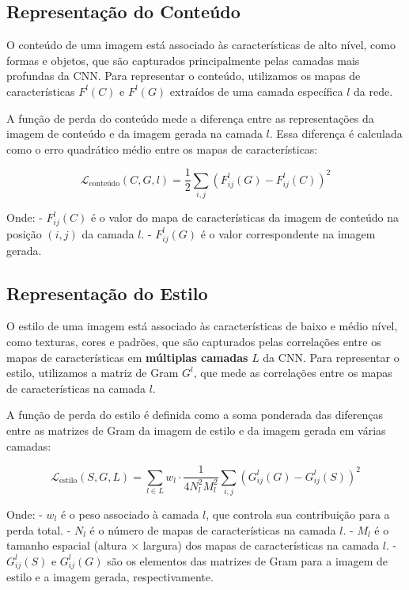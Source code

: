 \documentclass[a4paper]{tufte-handout}
\begin{document}
\subsection{Representação do Conteúdo}

O conteúdo de uma imagem está associado às características de alto nível, como formas e objetos, que são capturados principalmente pelas camadas mais profundas da CNN. Para representar o conteúdo, utilizamos os mapas de características $F^l(C)$ e $F^l(G)$ extraídos de uma camada específica $l$ da rede.

A função de perda do conteúdo mede a diferença entre as representações da imagem de conteúdo e da imagem gerada na camada $l$. Essa diferença é calculada como o erro quadrático médio entre os mapas de características:

\begin{equation*}
    \mathcal{L}_{\text{conteúdo}} (C, G, l) = \frac{1}{2} \sum_{i,j} \left(F_{ij}^l(G) - F_{ij}^l(C)\right)^2
\end{equation*}

Onde:
- $F_{ij}^l(C)$ é o valor do mapa de características da imagem de conteúdo na posição $(i,j)$ da camada $l$.
- $F_{ij}^l(G)$ é o valor correspondente na imagem gerada.

\subsection{Representação do Estilo}

O estilo de uma imagem está associado às características de baixo e médio nível, como texturas, cores e padrões, que são capturados pelas correlações entre os mapas de características em \textbf{múltiplas camadas} $L$ da CNN. Para representar o estilo, utilizamos a matriz de Gram $G^l$, que mede as correlações entre os mapas de características na camada $l$.

A função de perda do estilo é definida como a soma ponderada das diferenças entre as matrizes de Gram da imagem de estilo e da imagem gerada em várias camadas:

\begin{equation*}
    \mathcal{L}_{\text{estilo}} (S, G, L) = \sum_{l \in L} w_l \cdot \frac{1}{4N_l^2 M_l^2} \sum_{i,j} \left(G^l_{ij}(G) - G^l_{ij}(S)\right)^2
\end{equation*}

Onde:
- $w_l$ é o peso associado à camada $l$, que controla sua contribuição para a perda total.
- $N_l$ é o número de mapas de características na camada $l$.
- $M_l$ é o tamanho espacial (altura $\times$ largura) dos mapas de características na camada $l$.
- $G^l_{ij}(S)$ e $G^l_{ij}(G)$ são os elementos das matrizes de Gram para a imagem de estilo e a imagem gerada, respectivamente.
\end{document}
